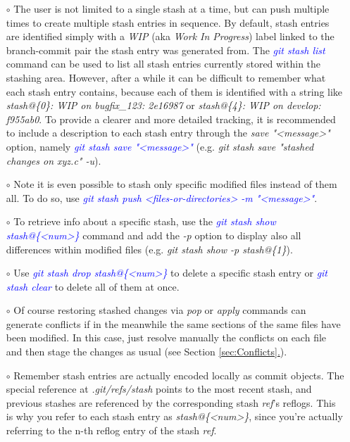\documentclass[a4paper,portrait,10pt]{article}   %
\newcommand{\mybulletlvA}{$\circ$}   %
\newcommand{\mycmd}[1]{\textcolor{blue}{\textit{#1}}}   %
\newcommand{\myparvspace}{\vspace{4mm}}   %
\newcommand{\mysecref}[1]{\hyperref[#1]{\ref{#1}.}}   %
\begin{document}
\begin{itemize}
\item[\mybulletlvA] The user is not limited to a single stash at a time, but can push multiple times to create multiple stash entries in sequence. By default, stash entries are identified simply with a \textit{WIP} (aka \textit{Work In Progress}) label linked to the branch-commit pair the stash entry was generated from. The \mycmd{git stash list} command can be used to list all stash entries currently stored within the stashing area. However, after a while it can be difficult to remember what each stash entry contains, because each of them is identified with a string like \textit{stash@\{0\}: WIP on bugfix\_123: 2e16987} or \textit{stash@\{4\}: WIP on develop: f955ab0}. To provide a clearer and more detailed tracking, it is recommended to include a description to each stash entry through the \textit{save "<message>"} option, namely \mycmd{git stash save "<message>"} (e.g. \textit{git stash save "stashed changes on xyz.c" -u}).
\myparvspace

\item[\mybulletlvA] Note it is even possible to stash only specific modified files instead of them all. To do so, use \mycmd{git stash push <files-or-directories> -m "<message>"}.
\myparvspace

\item[\mybulletlvA] To retrieve info about a specific stash, use the \mycmd{git stash show stash@\{<num>\}} command and add the \textit{-p} option to display also all differences within modified files (e.g. \textit{git stash show -p stash@\{1\}}).
\myparvspace

\item[\mybulletlvA] Use \mycmd{git stash drop stash@\{<num>\}} to delete a specific stash entry or \mycmd{git stash clear} to delete all of them at once.
\myparvspace

\item[\mybulletlvA] Of course restoring stashed changes via \textit{pop} or \textit{apply} commands can generate conflicts if in the meanwhile the same sections of the same files have been modified. In this case, just resolve manually the conflicts on each file and then stage the changes as usual (see Section \mysecref{sec:Conflicts}).
\myparvspace

\item[\mybulletlvA] Remember stash entries are actually encoded locally as commit objects. The special reference at \textit{.git/refs/stash} points to the most recent stash, and previous stashes are referenced by the corresponding stash \textit{ref}'s reflogs. This is why you refer to each stash entry as \textit{stash@\{<num>\}}, since you're actually referring to the n-th reflog entry of the stash \textit{ref}.
\myparvspace


\end{itemize}
\end{document}
